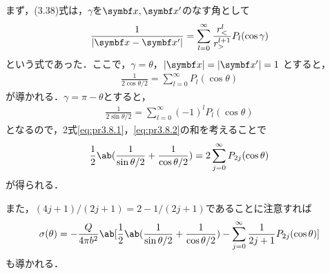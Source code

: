   まず，(3.38)式は，$\gamma$を$\bs{x}, \bs{x'}$のなす角として
  \begin{gather}%
    \frac{1}{|\bs{x}-\bs{x}'|} = \sum_{l=0}^\infty \frac{r_<^l}{r_>^{l+1}}P_l(\cos\gamma)
  \end{gather}%
  という式であった．ここで，$\gamma = \theta$，$|\bs{x}| = |\bs{x}'| = 1$
  とすると，
  \begin{gather}%
    \label{eq:pr3.8.1}
    \frac{1}{2\cos\theta/2} = \sum_{l=0}^\infty P_l(\cos\theta)
  \end{gather}%
  が導かれる．$\gamma = \pi -\theta$とすると，
  \begin{gather}%
    \label{eq:pr3.8.2}
    \frac{1}{2\sin\theta/2} = \sum_{l=0}^\infty (-1)^l P_l(\cos\theta)
  \end{gather}%
  となるので，2式\eqref{eq:pr3.8.1}，\eqref{eq:pr3.8.2}の和を考えることで
  \begin{gather}%
    \frac{1}{2}\ab(\frac{1}{\sin\theta/2} + \frac{1}{\cos\theta/2}) = 2 \sum_{j=0}^\infty P_{2j}(\cos\theta)
  \end{gather}%
  が得られる．

  また，$(4j+1)/(2j+1) = 2 - 1/(2j+1)$であることに注意すれば
  \begin{gather}%
    \sigma(\theta) = -\frac{Q}{4\pi b^2} \ab[\frac{1}{2}\ab(\frac{1}{\sin\theta/2} + \frac{1}{\cos\theta/2}) - \sum_{j=0}^\infty \frac{1}{2j+1} P_{2j}(\cos\theta)]
  \end{gather}%
  も導かれる．


\clearpage
